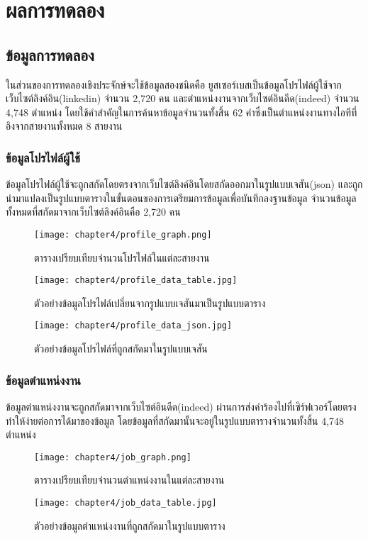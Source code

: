 \chapter{ผลการทดลอง}

\section{ข้อมูลการทดลอง}
ในส่วนของการทดลองเชิงประจักษ์จะใช้ข้อมูลสองชนิดคือ ยูสเซอร์เบสเป็นข้อมูลโปรไฟล์ผู้ใช้จากเว็บไซต์ลิงค์อิน(linkedin) จำนวน 2,720 คน และตำแหน่งงานจากเว็บไซต์อินดีด(indeed) จำนวน 4,748 ตำแหน่ง โดยใช้คำสำคัญในการค้นหาข้อมูลจำนวนทั้งสิ้น 62 คำซึ่งเป็นตำแหน่งงานทางไอทีที่อิงจากสายงานทั้งหมด 8 สายงาน
\subsection{ข้อมูลโปรไฟล์ผู้ใช้}
ข้อมูลโปรไฟล์ผู้ใช้จะถูกสกัดโดยตรงจากเว็บไซต์ลิงค์อินโดยสกัดออกมาในรูปแบบเจสัน(json) และถูกนำมาแปลงเป็นรูปแบบตารางในขั้นตอนของการเตรียมการข้อมูลเพื่อบันทึกลงฐานข้อมูล จำนวนข้อมูลทั้งหมดที่สกัดมาจากเว็บไซต์ลิงค์อินคือ 2,720 คน
\newline
\begin{figure}[!h]
  \centering
  \texttt{[image: chapter4/profile\_graph.png]}  
  \caption{ตารางเปรียบเทียบจำนวนโปรไฟล์ในแต่ละสายงาน}
  \label{Fig:result-profile-group}
\end{figure}

\begin{figure}[!h]
  \centering
  \texttt{[image: chapter4/profile\_data\_table.jpg]}  
  \caption{ตัวอย่างข้อมูลโปรไฟล์เปลี่ยนจากรูปแบบเจสันมาเป็นรูปแบบตาราง}
  \label{Fig:result-profile-group}
\end{figure}
\begin{figure}[!h]
  \centering
  \texttt{[image: chapter4/profile\_data\_json.jpg]}  
  \caption{ตัวอย่างข้อมูลโปรไฟล์ที่ถูกสกัดมาในรูปแบบเจสัน}
  \label{Fig:result-profile-group}
\end{figure}
\clearpage

\subsection{ข้อมูลตำแหน่งงาน}
ข้อมูลตำแหน่งงานจะถูกสกัดมาจากเว็บไซต์อินดีด(indeed) ผ่านการส่งคำร้องไปที่เซิร์ฟเวอร์โดยตรงทำให้ง่ายต่อการได้มาของข้อมูล โดยข้อมูลที่สกัดมานั้นจะอยู่ในรูปแบบตารางจำนวนทั้งสิ้น 4,748 ตำแหน่ง
\begin{figure}[!h]
  \centering
  \texttt{[image: chapter4/job\_graph.png]}  
  \caption{ตารางเปรียบเทียบจำนวนตำแหน่งงานในแต่ละสายงาน}
  \label{Fig:result-profile-group}
\end{figure}
\begin{figure}[!h]
  \centering
  \texttt{[image: chapter4/job\_data\_table.jpg]}  
  \caption{ตัวอย่างข้อมูลตำแหน่งงานที่ถูกสกัดมาในรูปแบบตาราง}
  \label{Fig:result-profile-group}
\end{figure}


